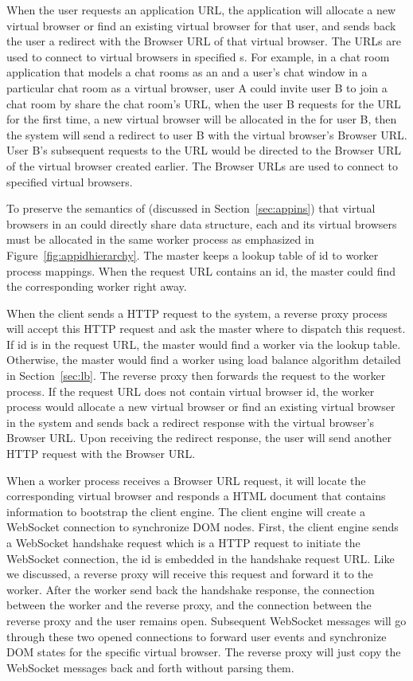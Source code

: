 When the user requests
 an application URL, the application will allocate a new virtual browser or
find an existing virtual browser for that user, and sends back the user a
redirect with the Browser URL of that virtual browser. The \appins URLs are
used to connect to virtual browsers in specified \appins{}s. For example, in a
chat room application that models a chat rooms as an \appins{} and a user's
chat window in a particular chat room  as a virtual browser, user A could
invite user B to join a chat room by share the chat room's \appins URL, when
the user B requests for the \appins URL for the first time, a new virtual
browser will be allocated in the \appins for user B, then the system will send
a redirect to user B with the virtual browser's Browser URL. User B's
subsequent requests to the \appins URL would be directed to the Browser URL of
the virtual browser created earlier. The Browser URLs are used to connect to
specified virtual browsers.



To preserve the semantics of \appins (discussed in Section~\ref{sec:appins})
that virtual browsers in an \appins could directly share data structure, each
\appins and its virtual browsers must be allocated in the same worker process
as emphasized in Figure~\ref{fig:appidhierarchy}. The master keeps a lookup
table of \appins id to worker process mappings.  When the request URL contains
an \appins id,  the master could find the corresponding worker right away.

When the client sends a HTTP request to the system, a reverse proxy process
will accept this HTTP request and ask the master where to dispatch this
request. If \appins id is in the request URL, the master would find a worker
via the lookup table. Otherwise, the master would find a worker using load
balance algorithm detailed in Section~\ref{sec:lb}. The reverse proxy then
forwards the request to the worker process. If the request URL does not
contain virtual browser id, the worker process would allocate a new virtual
browser or find an existing virtual browser in the system and sends back a
redirect response with the virtual browser's Browser URL. Upon receiving the
redirect response, the user will send another HTTP request with the Browser
URL.

When a worker process receives a Browser URL request, it will locate the
corresponding virtual browser and responds a HTML document that contains
information to bootstrap the client engine. The client engine will create a
WebSocket connection to synchronize DOM nodes. First, the client engine sends
a WebSocket handshake request which is a HTTP request to initiate the
WebSocket connection, the \appins id is embedded in the handshake request URL.
Like we discussed, a reverse proxy will receive this request and forward it to
the worker. After the worker send back the handshake response, the connection
between the worker and the reverse proxy, and the connection between the
reverse proxy and the user remains open. Subsequent WebSocket messages will go
through these two opened connections to forward user events and synchronize
DOM states for the specific virtual browser. The reverse proxy will just copy
the WebSocket messages back and forth without parsing them.

